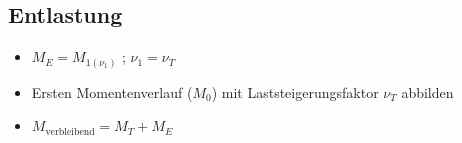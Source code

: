 \documentclass[fleqn,twoside]{article}
\begin{document}
    \subsection{Entlastung}
        \begin{itemize}
            \item $M_E = M_{1(\nu_1)} $ ; $\nu_1 = \nu_T$
            \item Ersten Momentenverlauf ($M_0$) mit Laststeigerungsfaktor $\nu_T$ abbilden
            \item $M_{\text{verbleibend}} = M_T + M_E$
        \end{itemize}





    
\end{document}
